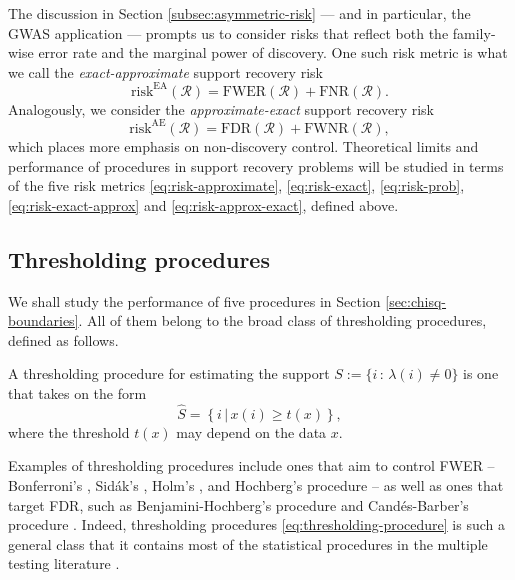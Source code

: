 The discussion in Section \ref{subsec:asymmetric-risk} --- and in particular, the GWAS application --- prompts us to consider risks that reflect both the family-wise error rate and the marginal power of discovery.
One such risk metric is what we call the \emph{exact-approximate} support recovery risk
\begin{equation} \label{eq:risk-exact-approx}
    \mathrm{risk}^{\mathrm{EA}}(\mathcal{R}) = \mathrm{FWER}(\mathcal{R}) + \mathrm{FNR}(\mathcal{R}).
\end{equation}
Analogously, we consider the \emph{approximate-exact} support recovery risk
\begin{equation} \label{eq:risk-approx-exact}
    \mathrm{risk}^{\mathrm{AE}}(\mathcal{R}) = \mathrm{FDR}(\mathcal{R}) + \mathrm{FWNR}(\mathcal{R}),
\end{equation}
which places more emphasis on non-discovery control.
Theoretical limits and performance of procedures in support recovery problems will be studied in terms of the five risk metrics \eqref{eq:risk-approximate}, \eqref{eq:risk-exact}, \eqref{eq:risk-prob}, \eqref{eq:risk-exact-approx} and \eqref{eq:risk-approx-exact}, defined above.

\subsection{Thresholding procedures}
\label{subsec:thresholding-procedures}

We shall study the performance of five procedures in Section \ref{sec:chisq-boundaries}.
All of them belong to the broad class of thresholding procedures, defined as follows.
\begin{definition}
A thresholding procedure for estimating the support 
$S:=\{i\, :\, \lambda(i)\neq0\}$ is one that takes on the form
\begin{equation} \label{eq:thresholding-procedure}
    \widehat{S} = \left\{i\,|\,x(i) \ge t(x)\right\},
\end{equation}
where the threshold $t(x)$ may depend on the data $x$.
\end{definition}
Examples of thresholding procedures include ones that aim to control FWER -- Bonferroni's \cite{dunn1961multiple}, Sid\'ak's \citep{vsidak1967rectangular}, Holm's \citep{holm1979simple}, and Hochberg's procedure \citep{hochberg1988sharper} -- as well as ones that target FDR, such as Benjamini-Hochberg's procedure \cite{benjamini1995controlling} and Cand\'es-Barber's procedure \cite{barber2015controlling}.
Indeed, thresholding procedures \eqref{eq:thresholding-procedure} is such a general class that it contains most of the statistical procedures in the multiple testing literature \cite{roquain2011type}.

